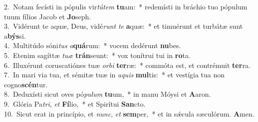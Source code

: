 {2.~}Notam fecísti in pópulis vir\textit{tú}\textit{tem} \textbf{tu}am:~* redemísti in bráchio tuo pópulum tuum fílios Jacob et \textbf{Jo}seph.\\
{3.~}Vidérunt te aquæ, Deus, vidé\textit{runt} \textit{te} \textbf{a}quæ:~* et timuérunt et turbátæ sunt a\textbf{býs}si.\\
{4.~}Multitúdo sóni\textit{tus} \textit{a}\textbf{quá}rum:~* vocem dedérunt \textbf{nu}bes.\\
{5.~}Etenim sagíttæ \textit{tu}\textit{æ} \textbf{trán}seunt:~* vox tonítrui tui in \textbf{ro}ta.\\
{6.~}Illuxérunt coruscatiónes tuæ \textit{or}\textit{bi} \textbf{ter}ræ:~* commóta est, et contrémuit \textbf{ter}ra.\\
{7.~}In mari via tua, et sémitæ tuæ in \textit{a}\textit{quis} \textbf{mul}tis:~* et vestígia tua non cogno\textbf{scén}tur.\\
{8.~}Deduxísti sicut oves pó\textit{pu}\textit{lum} \textbf{tu}um,~* in manu Móysi et \textbf{A}aron.\\
{9.~}Glória Pa\textit{tri}, \textit{et} \textbf{Fí}lio,~* et Spirítui \textbf{San}cto.\\
{10.~}Sicut erat in princípio, et \textit{nunc}, \textit{et} \textbf{sem}per,~* et in sǽcula sæculórum. \textbf{A}men.\\
